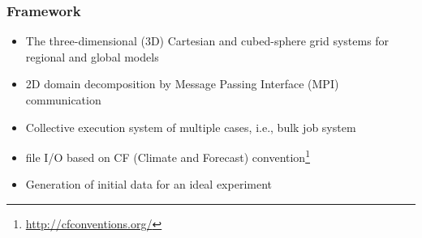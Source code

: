 \subsubsection{Framework}
\begin{itemize}
 \item The three-dimensional (3D) Cartesian and cubed-sphere grid systems for regional and global models
 \item 2D domain decomposition by Message Passing Interface (MPI) communication
 \item Collective execution system of multiple cases, i.e., bulk job system
 \item \netcdf file I/O based on CF (Climate and Forecast) convention\footnote{\url{http://cfconventions.org/}}
 \item Generation of initial data for an ideal experiment
\end{itemize}

